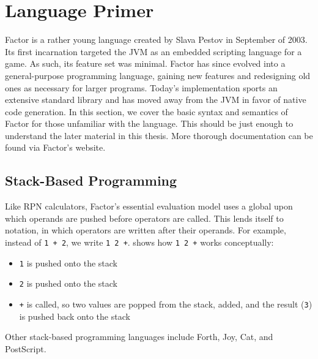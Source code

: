 \section{Language Primer}


Factor is a rather young language created by Slava Pestov in September of 2003.
Its first incarnation targeted the \gls{JVM} as an embedded scripting language
for a game.  As such, its feature set was minimal.  Factor has since evolved
into a general-purpose programming language, gaining new features and
redesigning old ones as necessary for larger programs.  Today's implementation
sports an extensive standard library and has moved away from the \gls{JVM} in
favor of native code generation.  In this section, we cover the basic syntax and semantics of Factor for those
unfamiliar with the language.  This should be just enough to understand the
later material in this thesis.  More thorough documentation
can be found via Factor's website.

\subsection{Stack-Based Programming}


Like \gls{RPN} calculators, Factor's essential evaluation model uses a global
 upon which operands are pushed before operators are called.  This
lends itself to  notation, in which operators are written after
their operands.  For example, instead of \texttt{1~+~2}, we write
\texttt{1~2~+}.   shows how \texttt{1~2~+} works conceptually:
\begin{itemize}
  \item \texttt{1} is pushed onto the stack
  \item \texttt{2} is pushed onto the stack
  \item \texttt{+} is called, so two values are popped from the stack, added,
        and the result (\texttt{3}) is pushed back onto the stack
\end{itemize}
Other stack-based programming languages include Forth,
Joy, Cat, and PostScript.

